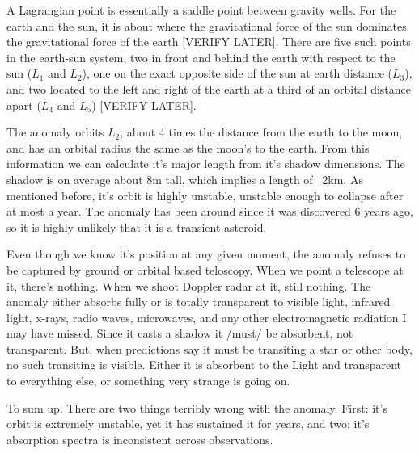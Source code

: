 \documentclass[a5paper,10pt]{book}
\begin{document}
A Lagrangian point is essentially a saddle point between gravity wells. For the earth and the sun, it is about where the gravitational force of the sun dominates the gravitational force of the earth [VERIFY LATER]. There are five such points in the earth-sun system, two in front and behind the earth with respect to the sun ($L_1$ and $L_2$), one on the exact opposite side of the sun at earth distance ($L_3$), and two located to the left and right of the earth at a third of an orbital distance apart ($L_4$ and $L_5$) [VERIFY LATER].

The anomaly orbits $L_2$, about 4 times the distance from the earth to the moon, and has an orbital radius the same as the moon's to the earth. From this information we can calculate it's major length from it's shadow dimensions. The shadow is on average about 8m tall, which implies a length of ~2km. As mentioned before, it's orbit is highly unstable, unstable enough to collapse after at most a year. The anomaly has been around since it was discovered 6 years ago, so it is highly unlikely that it is a transient asteroid.

Even though we know it's position at any given moment, the anomaly refuses to be captured by ground or orbital based teloscopy. When we point a telescope at it, there's nothing. When we shoot Doppler radar at it, still nothing. The anomaly either absorbs fully or is totally transparent to visible light, infrared light, x-rays, radio waves, microwaves, and any other electromagnetic radiation I may have missed. Since it casts a shadow it /must/ be absorbent, not transparent. But, when predictions say it must be transiting a star or other body, no such transiting is visible. Either it is absorbent to the Light and transparent to everything else, or something very strange is going on.

To sum up. There are two things terribly wrong with the anomaly. First: it's orbit is extremely unstable, yet it has sustained it for years, and two: it's absorption spectra is inconsistent across observations.
\end{document}
